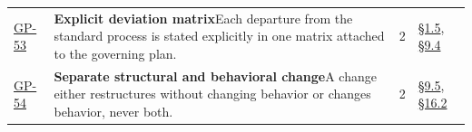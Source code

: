 \begin{longtable}{@{}p{} p{} r p{}@{}}
\hyperlink{gp-53}{GP-53}\hypertarget{gp-53}{} & \textbf{Explicit deviation matrix}\newline Each departure from the standard process is stated explicitly in one matrix attached to the governing plan.\rule[-\normalbaselineskip]{0pt}{0pt} & 2 & \hyperlink{nss-1.5}{\S1.5}, \hyperlink{nss-9.4}{\S9.4}\rule[-\normalbaselineskip]{0pt}{0pt} \\
\hyperlink{gp-54}{GP-54}\hypertarget{gp-54}{} & \textbf{Separate structural and behavioral change}\newline A change either restructures without changing behavior or changes behavior, never both. & 2 & \hyperlink{nss-9.5}{\S9.5}, \hyperlink{nss-16.2}{\S16.2} \\
\bottomrule
\end{longtable}
\endgroup

